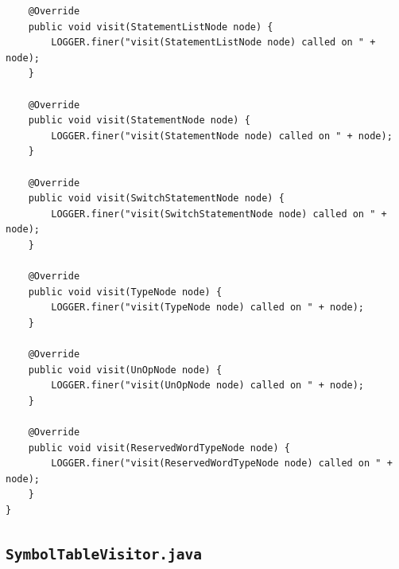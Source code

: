 \documentclass{book}
\begin{document}
\begin{verbatim}
	@Override
	public void visit(StatementListNode node) {
		LOGGER.finer("visit(StatementListNode node) called on " + node);
	}

	@Override
	public void visit(StatementNode node) {
		LOGGER.finer("visit(StatementNode node) called on " + node);
	}

	@Override
	public void visit(SwitchStatementNode node) {
		LOGGER.finer("visit(SwitchStatementNode node) called on " + node);
	}

	@Override
	public void visit(TypeNode node) {
		LOGGER.finer("visit(TypeNode node) called on " + node);
	}

	@Override
	public void visit(UnOpNode node) {
		LOGGER.finer("visit(UnOpNode node) called on " + node);
	}

	@Override
	public void visit(ReservedWordTypeNode node) {
		LOGGER.finer("visit(ReservedWordTypeNode node) called on " + node);
	}
}
\end{verbatim}

\subsection{\texttt{SymbolTableVisitor.java}}
\end{document}
